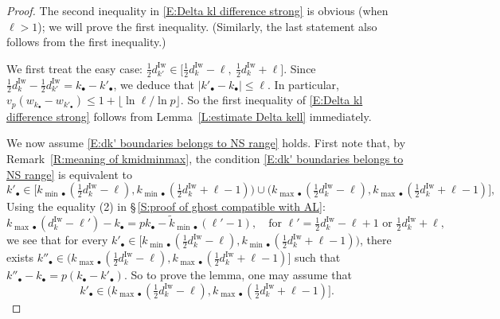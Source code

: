 \documentclass[12pt]{amsart}
\theoremstyle{definition}
\numberwithin{equation}{subsection}
\newcommand{\Iw}{\mathrm{Iw}}
\begin{document}
\begin{proof}
The second inequality in \eqref{E:Delta kl difference strong} is obvious (when $\ell >1$); we will prove the first inequality. (Similarly, the last statement also follows from the first inequality.)

We first treat the easy case: $\frac 12d_{k'}^\Iw \in \big[\frac 12d_k^\Iw-\ell, \ \frac 12d_k^\Iw+\ell\big]$.
Since $\frac 12 d_{k}^\Iw - \frac 12 d_{k'}^\Iw = k_\bullet - k'_\bullet$, we deduce that $|k'_\bullet - k_\bullet|\leq \ell$. In particular, $v_p(w_{k_\bullet}-w_{k'_\bullet}) \leq 1+ \big\lfloor \ln \ell / \ln p\big\rfloor$. So the first inequality of \eqref{E:Delta kl difference strong} follows from Lemma~\ref{L:estimate Delta kell} immediately.

We now assume \eqref{E:dk' boundaries belongs to NS range} holds.  First note that, by Remark~\ref{R:meaning of kmidminmax}, the condition \eqref{E:dk' boundaries belongs to NS range} is equivalent to
\begin{equation}
\label{E:k' so that dk'unr in Steinberg}
k'_\bullet \in \big[k_{{\min}\bullet}(\tfrac 12 d_{k}^\Iw - \ell), k_{{\min}\bullet}(\tfrac 12 d_{k}^\Iw + \ell-1) \big) \cup \big(k_{{\max}\bullet}(\tfrac 12 d_{k}^\Iw - \ell), k_{{\max}\bullet}(\tfrac 12 d_{k}^\Iw + \ell-1) \big],
\end{equation}
Using the equality (2) in \S\,\ref{S:proof of ghost compatible with AL}:
\begin{equation}
\label{E:near Steinberg duality}
k_{{\max}\bullet}(d_{k}^\Iw - \ell') - k_\bullet= pk_\bullet - \tilde k_{{\min}\bullet}(\ell' -1 ), \quad \textrm{for }\ell'  = \tfrac 12 d_{k}^\Iw- \ell+1 \textrm{ or } \tfrac 12 d_{k}^\Iw +\ell,
\end{equation}
we see that for every $k'_\bullet \in \big[k_{{\min}\bullet}(\tfrac 12 d_{k}^\Iw - \ell), k_{{\min}\bullet}(\tfrac 12 d_{k}^\Iw + \ell-1) \big)$, there exists $k''_\bullet \in \big(k_{{\max}\bullet}(\tfrac 12 d_{k}^\Iw - \ell), k_{{\max}\bullet}(\tfrac 12 d_{k}^\Iw + \ell-1) \big]$ such that
$
k''_\bullet -k_\bullet = p(k_\bullet  -k'_\bullet).
$
So to prove the lemma, one may assume that 
\begin{equation}
\label{E:condition on k'}
k'_\bullet \in \big(k_{{\max}\bullet}(\tfrac 12 d_{k}^\Iw - \ell), k_{{\max}\bullet}(\tfrac 12 d_{k}^\Iw + \ell-1) \big].
\end{equation}


\end{proof}
\end{document}
